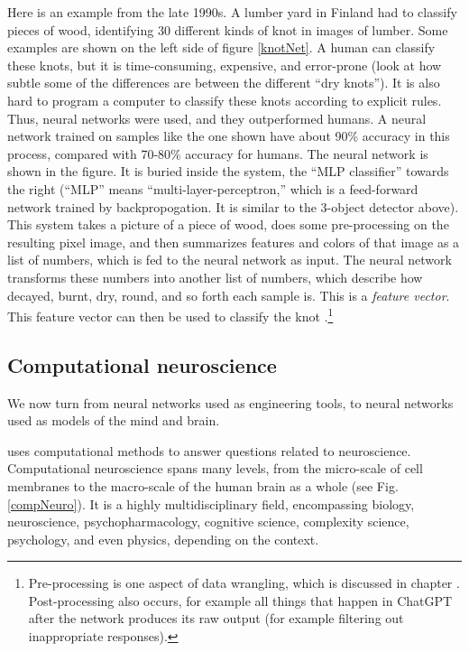 Here is an example from the late 1990s. A lumber yard in Finland had to classify pieces of wood, identifying 30 different kinds of knot in images of lumber. Some examples are shown on the left side of figure \ref{knotNet}. A human can classify these knots, but it is time-consuming, expensive, and error-prone (look at how subtle some of the differences are between the different ``dry knots''). It is also hard to program a computer to classify these knots according to explicit rules. Thus, neural networks were used, and they outperformed humans. A neural network trained on samples like the one shown have about 90\% accuracy in this process, compared with 70-80\% accuracy for humans. The neural network is shown in the figure. It is  buried inside the system, the ``MLP classifier'' towards the right (``MLP'' means ``multi-layer-perceptron,'' which is a feed-forward network trained by backpropogation. It is  similar to the 3-object detector above). This system takes a picture of a piece of wood, does some pre-processing on the resulting pixel image, and then summarizes features and colors of that image as a list of numbers, which is fed to the neural network as input. The neural network transforms these numbers into another list of numbers, which describe how decayed, burnt, dry, round, and so forth each sample is. This is a \emph{feature vector}. This feature vector can then be used to classify the knot \cite{heikkonen1999building}.\footnote{Pre-processing is one aspect of data wrangling, which is discussed in chapter .  Post-processing also occurs, for example all things that happen in ChatGPT  after the network produces its raw output (for example filtering out inappropriate responses).}

\subsection{Computational neuroscience}\label{computationalNeuroscience}

We now turn from neural networks used as engineering tools, to neural networks used as models of the mind and brain.

 uses computational methods to answer questions related to neuroscience. Computational neuroscience spans many levels, from the micro-scale of cell membranes to the macro-scale of the human brain as a whole (see Fig. \ref{compNeuro}). It is a highly multidisciplinary field, encompassing biology, neuroscience, psychopharmacology, cognitive science, complexity science, psychology, and even physics, depending on the context. 

